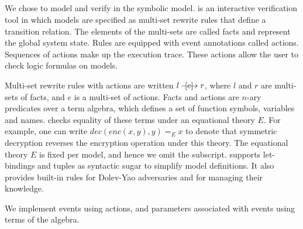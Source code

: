\subsection{\mTamarin{}}
\label{sec:tamarin}
We chose \mTamarin{} to model and verify \mEdhoc{} in the symbolic model.
%
\mTamarin{} is an interactive verification tool in which models are specified
as multi-set rewrite rules that define a transition relation.
%
The elements of the multi-sets are called facts and represent the global system
state.
%
Rules are equipped with event annotations called actions. Sequences of actions make up the execution trace.
%
These actions allow the user to check logic formulas on models.
%
%

Multi-set rewrite rules with actions are written $ l \ifarrow[e] r $,
where $l$ and $r$ are multi-sets of facts, and $e$ is a multi-set of actions.
%
Facts and actions are $n$-ary predicates over a term algebra, which defines a
set of function symbols, variables and names.
%
\mTamarin{} checks equality of these terms under an equational theory $E$.
%
For example, one can write $ dec(enc(x,y),y) =_E x $
to denote that symmetric decryption reverses the encryption operation under
this theory.
%
The equational theory $E$ is fixed per model, and hence we omit the subscript.
%
\mTamarin{} supports let-bindings and tuples as syntactic sugar to simplify
model definitions.
%
It also provides built-in rules for Dolev-Yao adversaries and for
managing their knowledge.
%

We implement events using actions, and parameters associated with events using
terms of the algebra.\\
%

%

